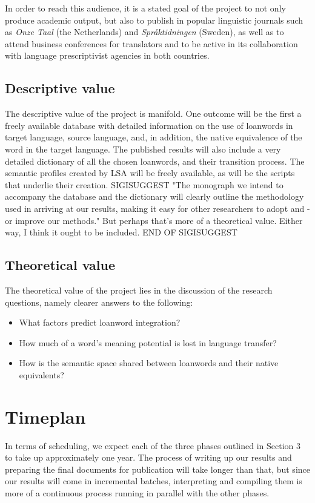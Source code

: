 \documentclass[a4paper]{article}
\begin{document}
In order to reach this audience, it is a stated goal of the project to not only produce academic output, but also to publish in popular linguistic journals such as \emph{Onze Taal} (the Netherlands) and \emph{Spr\aa ktidningen} (Sweden), as well as to attend business conferences for translators and to be active in its collaboration with language prescriptivist agencies in both countries. 


\subsection{Descriptive value}
The descriptive value of the project is manifold. One outcome will be the first a freely available database with detailed information on the use of loanwords in target language, source language, and, in addition, the native equivalence of the word in the target language. The published results will also include a very detailed dictionary of all the chosen loanwords, and their transition process. The semantic profiles created by LSA will be freely available, as will be the scripts that underlie their creation. 
SIGISUGGEST "The monograph we intend to accompany the database and the dictionary will clearly outline the methodology used in arriving at our results, making it easy for other researchers to adopt and - or improve our methods." But perhaps that's more of a theoretical value. Either way, I think it ought to be included. END OF SIGISUGGEST



\subsection{Theoretical value}
The theoretical value of the project lies in the discussion of the research questions, namely clearer answers to the following:
\begin{itemize}
	\item What factors predict loanword integration?
	\item How much of a word's meaning potential is lost in language transfer?
	\item How is the semantic space shared between loanwords and their native equivalents?	
\end{itemize}




\section{Timeplan}
In terms of scheduling, we expect each of the three phases outlined in Section 3 to take up approximately one year. The process of writing up our results and preparing the final documents for publication will take longer than that, but since our results will come in incremental batches, interpreting and compiling them is more of a continuous process running in parallel with the other phases.
\end{document}
